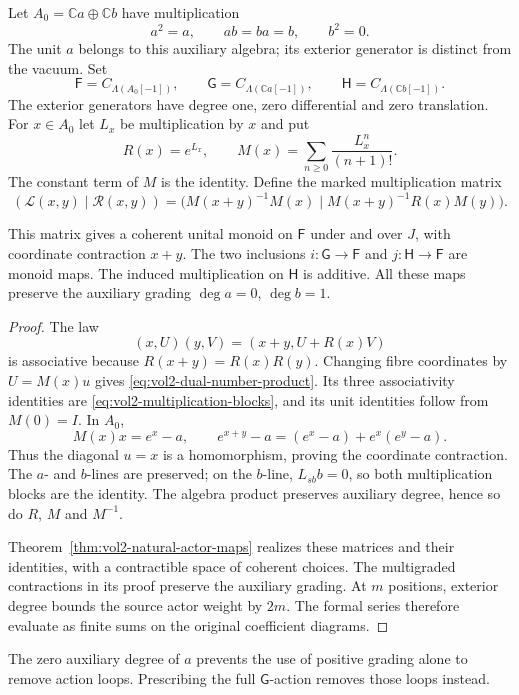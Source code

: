 Let $A_0=\mathbb C a\oplus\mathbb C b$ have multiplication
\[
 a^2=a,\qquad ab=ba=b,\qquad b^2=0.
\]
The unit $a$ belongs to this auxiliary algebra; its exterior
generator is distinct from the vacuum. Set
\[
 \mathsf F=C_{\Lambda(A_0[-1])},\qquad
 \mathsf G=C_{\Lambda(\mathbb C a[-1])},\qquad
 \mathsf H=C_{\Lambda(\mathbb C b[-1])}.
\]
The exterior generators have degree one, zero differential and
zero translation. For $x\in A_0$ let $L_x$ be multiplication by
$x$ and put
\[
 R(x)=e^{L_x},\qquad
 M(x)=\sum_{n\geq0}\frac{L_x^n}{(n+1)!}.
\]
The constant term of $M$ is the identity. Define the marked
multiplication matrix
\begin{equation}\label{eq:vol2-dual-number-product}
 (\mathcal L(x,y)\mid\mathcal R(x,y))
 =\bigl(M(x+y)^{-1}M(x)\mid
        M(x+y)^{-1}R(x)M(y)\bigr).
\end{equation}

\begin{lemma}\label{lem:vol2-dual-number-monoid}
This matrix gives a coherent unital monoid on $\mathsf F$ under
and over $J$, with coordinate contraction $x+y$.
The two inclusions
$i:\mathsf G\to\mathsf F$ and $j:\mathsf H\to\mathsf F$
are monoid maps. The induced multiplication on $\mathsf H$ is
additive. All these maps preserve the auxiliary grading
$\deg a=0$, $\deg b=1$.
\end{lemma}
\begin{proof}
The law
\[
 (x,U)(y,V)=(x+y,U+R(x)V)
\]
is associative because $R(x+y)=R(x)R(y)$.
Changing fibre coordinates by $U=M(x)u$ gives
\eqref{eq:vol2-dual-number-product}. Its three associativity
identities are \eqref{eq:vol2-multiplication-blocks}, and its
unit identities follow from $M(0)=I$. In $A_0$,
\[
 M(x)x=e^x-a,\qquad
 e^{x+y}-a=(e^x-a)+e^x(e^y-a).
\]
Thus the diagonal $u=x$ is a homomorphism, proving the coordinate
contraction. The $a$- and $b$-lines are preserved; on the $b$-line,
$L_{sb}b=0$, so both multiplication blocks are the identity.
The algebra product preserves auxiliary degree, hence so do
$R$, $M$ and $M^{-1}$.

Theorem~\ref{thm:vol2-natural-actor-maps} realizes these matrices
and their identities, with a contractible space of coherent
choices. The multigraded contractions in its proof preserve the
auxiliary grading. At $m$ positions, exterior degree bounds the
source actor weight by $2m$. The formal series therefore evaluate
as finite sums on the original coefficient diagrams.
\end{proof}

The zero auxiliary degree of $a$ prevents the use of positive
grading alone to remove action loops. Prescribing the full
$\mathsf G$-action removes those loops instead.

